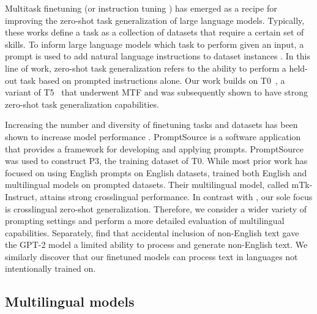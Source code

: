 \documentclass[11pt]{article}
\begin{document}
Multitask finetuning \cite{sanh2022multitask} (or instruction tuning \cite{wei2021finetuned}) has emerged as a recipe for improving the zero-shot task generalization of large language models. Typically, these works define a task as a collection of datasets that require a certain set of skills. To inform large language models which task to perform given an input, a prompt is used to add natural language instructions to dataset instances \cite{schick2020exploiting,scao2021many}. In this line of work, zero-shot task generalization refers to the ability to perform a held-out task based on prompted instructions alone. Our work builds on T0~\citep{sanh2022multitask}, a variant of T5~\citep{raffel2020exploring} that underwent MTF and was subsequently shown to have strong zero-shot task generalization capabilities.

Increasing the number and diversity of finetuning tasks and datasets has been shown to increase model performance \cite{min2021metaicl,fries2022bigbio,wang2022zemi,scialom2022continual,chung2022scaling,mishra2021}. PromptSource \cite{promptsource} is a software application that provides a framework for developing and applying prompts. PromptSource was used to construct P3, the training dataset of T0. While most prior work has focused on using English prompts on English datasets, \citet{wang2022super} trained both English and multilingual models on prompted datasets. Their multilingual model, called mTk-Instruct, attains strong crosslingual performance. In contrast with \citet{wang2022super}, our sole focus is crosslingual zero-shot generalization. Therefore, we consider a wider variety of prompting settings and perform a more detailed evaluation of multilingual capabilities. Separately, \citet{radford2019language} find that accidental inclusion of non-English text gave the GPT-2 model a limited ability to process and generate non-English text. We similarly discover that our finetuned models can process text in languages not intentionally trained on.

\subsection{Multilingual models}
\end{document}
